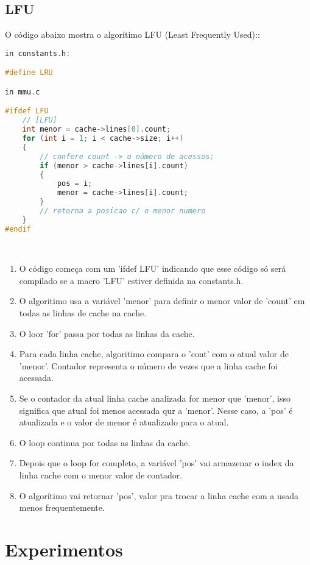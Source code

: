 \documentclass{article}
\begin{document}
\subsection{LFU}
O código abaixo mostra o algorítimo LFU (Least Frequently Used)::\\
\begin{lstlisting}[caption={Trecho de código referente a LFU},label={lst:cod1},language=C]
in constants.h:

#define LRU

in mmu.c

#ifdef LFU
    // [LFU]
    int menor = cache->lines[0].count;
    for (int i = 1; i < cache->size; i++)
    {
        // confere count -> o número de acessos;
        if (menor > cache->lines[i].count)
        {
            pos = i;
            menor = cache->lines[i].count;
        }
        // retorna a posicao c/ o menor numero
    }
#endif

\end{lstlisting}
\\
\begin{enumerate}
    \item O código começa com um 'ifdef LFU' indicando que esse código só será compilado se a macro 'LFU' estiver definida na constants.h.
    \item O algoritimo usa a variável 'menor' para definir o menor valor de 'count' em todas as linhas de cache na cache.
    \item O loor 'for' passa por todas as linhas da cache.
    \item Para cada linha cache, algoritimo compara o 'cont' com o atual valor de 'menor'. Contador representa o número de vezes que a linha cache foi acessada.
    \item Se o contador da atual linha cache analizada for menor que 'menor', isso significa que atual foi menos acessada qur a 'menor'. Nesse caso, a 'pos' é atualizada e o valor de menor é atualizado para o atual.
    \item O loop continua por todas as linhas da cache.
    \item Depois que o loop for completo, a variável 'pos' vai armazenar o index da linha cache com o menor valor de contador.
    \item O algorítimo vai retornar 'pos', valor pra trocar a linha cache com a usada menos frequentemente.
\end{enumerate}

\clearpage
\section{Experimentos}
\end{document}
